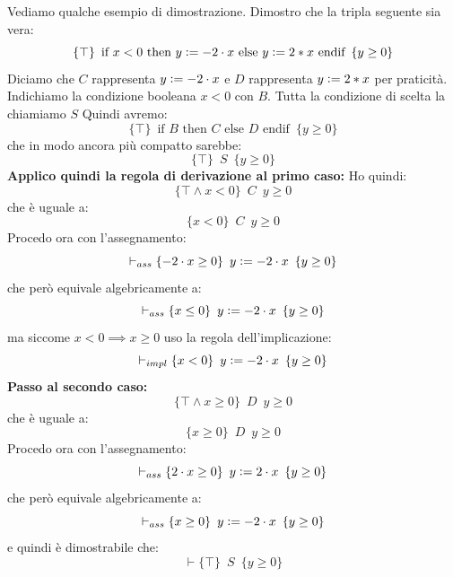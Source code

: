 \documentclass[a4paper,12pt, oneside]{book}
\def\cceq{\mathrel{\vcenter{\hbox{:}}{=}}}
\begin{document}
\begin{esempio}
  Vediamo qualche esempio di dimostrazione. Dimostro che la tripla seguente sia
  vera:
  \[\{\top\}\,\,\,\mbox{if } x<0 \mbox{ then }y\cceq -2\cdot x \mbox{ else }
    y\cceq 2*x\mbox{ endif}\,\,\,\{y\geq 0\}\]
  Diciamo che $C$ rappresenta $y\cceq -2\cdot x$ e $D$ rappresenta $y\cceq 2*x$
  per praticità. Indichiamo la condizione booleana $x<0$ con $B$. Tutta la
  condizione di scelta la chiamiamo $S$
  Quindi avremo:
  \[\{\top\}\,\,\,\mbox{if } B \mbox{ then }C\mbox{ else }
    D \mbox{ endif}\,\,\,\{y\geq 0\}\]
  che in modo ancora più compatto sarebbe:
  \[\{\top\}\,\,\,S\,\,\,\{y\geq 0\}\]
  \textbf{Applico quindi la regola di derivazione al primo caso:}
  Ho quindi:
  \[\{\top \land x<0\}\,\,\,C\,\,\,{y\geq 0}\]
  che è uguale a:
  \[\{x<0\}\,\,\,C\,\,\,{y\geq 0}\]
  Procedo ora con l'assegnamento:
  \[\vdash_{ass}\{-2\cdot x\geq 0\}\,\,\,y\cceq -2\cdot x\,\,\,\{y\geq 0\}\]
  che però equivale algebricamente a:
  \[\vdash_{ass}\{x\leq 0\}\,\,\,y\cceq -2\cdot x\,\,\,\{y\geq 0\}\]
  ma siccome $x<0 \implies x\geq 0$ uso la regola dell'implicazione:
  \[\vdash_{impl}\{x< 0\}\,\,\,y\cceq -2\cdot x\,\,\,\{y\geq 0\}\]
  \textbf{Passo al secondo caso:}
  \[\{\top \land x\geq 0\}\,\,\,D\,\,\,{y\geq 0}\]
  che è uguale a:
  \[\{x\geq 0\}\,\,\,D\,\,\,{y\geq 0}\]
  Procedo ora con l'assegnamento:
  \[\vdash_{ass}\{2\cdot x\geq 0\}\,\,\,y\cceq 2\cdot x\,\,\,\{y\geq 0\}\]
  che però equivale algebricamente a:
  \[\vdash_{ass}\{x\geq 0\}\,\,\,y\cceq -2\cdot x\,\,\,\{y\geq 0\}\]
  e quindi è dimostrabile che:
  \[\vdash \{\top\}\,\,\,S\,\,\,\{y\geq 0\}\]
\end{esempio}
\end{document}
